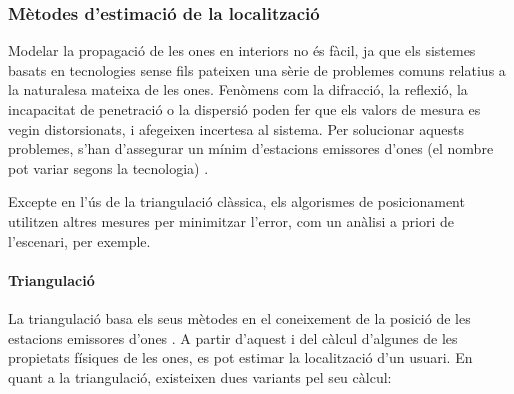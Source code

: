 \subsubsection{Mètodes d’estimació de la localització}

Modelar la propagació de les ones en interiors no és fàcil, ja que els sistemes basats en tecnologies sense fils pateixen una sèrie de problemes comuns relatius a la naturalesa mateixa de les ones. Fenòmens com la difracció, la reflexió, la incapacitat de penetració o la dispersió poden fer que els valors de mesura es vegin distorsionats, i afegeixen incertesa al sistema. Per solucionar aquests problemes, s’han d’assegurar un mínim d'estacions emissores d’ones (el nombre pot variar segons la tecnologia) \cite{bagosi}.

Excepte en l'ús de la triangulació clàssica, els algorismes de posicionament utilitzen altres mesures per minimitzar l'error, com un anàlisi a priori de l'escenari, per exemple.

\paragraph{Triangulació}

La triangulació basa els seus mètodes en el coneixement de la posició de les estacions emissores d’ones \cite{bagosi}. A partir d’aquest i del càlcul d’algunes de les propietats físiques de les ones, es pot estimar la localització d’un usuari. En quant a la triangulació, existeixen dues variants pel seu càlcul:


